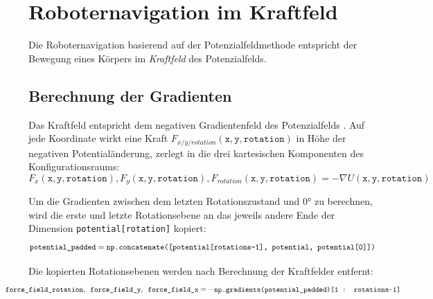\chapter{Roboternavigation im Kraftfeld}
\vspace*{-0.2cm}
Die Roboternavigation basierend auf der Potenzialfeldmethode entspricht der Bewegung eines Körpers im \textit{Kraftfeld} des Potenzialfelds.

\vspace*{-0.1cm}
\section{Berechnung der Gradienten}
\enlargethispage{0.9cm}

Das Kraftfeld entspricht dem negativen Gradientenfeld des Potenzialfelds \cite{khatib.1985}. Auf jede Koordinate wirkt eine Kraft $F_{x/y/rotation}(\texttt{x}, \texttt{y}, \texttt{rotation})$ in Höhe der negativen Potentialänderung, zerlegt in die drei kartesischen Komponenten des Konfigurationsraums:
\vspace*{0.13cm}
\begin{equation*}
 F_{x}(\texttt{x}, \texttt{y}, \texttt{rotation}), F_{y}(\texttt{x}, \texttt{y}, \texttt{rotation}), F_{rotation}(\texttt{x}, \texttt{y}, \texttt{rotation}) = -\nabla U(\texttt{x}, \texttt{y}, \texttt{rotation})
\end{equation*}

Um die Gradienten zwischen dem letzten Rotationszustand und $0$° zu berechnen, wird die erste und letzte Rotationsebene an das jeweils andere Ende der Dimension \texttt{potential[rotation]} kopiert:
\vspace*{0.15cm}
\begin{equation*}
\hspace*{-0.0075\linewidth}
\resizebox{1.05\linewidth}{!}{
$
	\texttt{potential\_padded} = \texttt{np.concatenate([potential[rotations-1], potential, potential[0]])}
$
}
\hspace*{-0.0075\linewidth}
\end{equation*}


Die kopierten Rotationsebenen werden nach Berechnung der Kraftfelder entfernt:
\vspace*{0.13cm}
\begin{equation*}
\hspace*{-0.1\linewidth}
\resizebox{1.2\linewidth}{!}{
$
\texttt{force\_field\_rotation}, \texttt{ force\_field\_y}, \texttt{ force\_field\_x} = -\texttt{np.gradients(potential\_padded)[1 : rotations-1]}
$
}
\hspace*{-0.1\linewidth}
\end{equation*}

